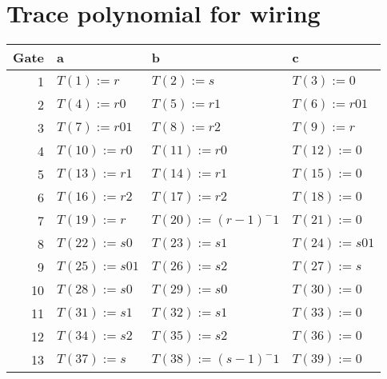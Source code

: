 \documentclass[11pt]{article}
\begin{document}
\section{Trace polynomial for wiring}
\label{sec:org232436d}
\begin{center}
\begin{tabular}{rlll}
Gate & a & b & c\\[0pt]
\hline
1 & \(T(1) := r\) & \(T(2):=s\) & \(T(3) :=  0\)\\[0pt]
2 & \(T(4) := r0\) & \(T(5):=r1\) & \(T(6) := r01\)\\[0pt]
3 & \(T(7) := r01\) & \(T(8) := r2\) & \(T(9) := r\)\\[0pt]
4 & \(T({10}) := r0\) & \(T({11}) := r0\) & \(T({12}) := 0\)\\[0pt]
5 & \(T({13}) := r1\) & \(T({14}) := r1\) & \(T({15}) := 0\)\\[0pt]
6 & \(T({16}) := r2\) & \(T({17}) := r2\) & \(T({18}) := 0\)\\[0pt]
7 & \(T({19}) := r\) & \(T({20}) := (r-1)^-1\) & \(T({21}) := 0\)\\[0pt]
8 & \(T({22}) := s0\) & \(T({23}) := s1\) & \(T({24}) := s01\)\\[0pt]
9 & \(T({25}) := s01\) & \(T({26}) := s2\) & \(T({27}) := s\)\\[0pt]
10 & \(T({28}) := s0\) & \(T({29}) := s0\) & \(T({30}) := 0\)\\[0pt]
11 & \(T({31}) := s1\) & \(T({32}) := s1\) & \(T({33}) := 0\)\\[0pt]
12 & \(T({34}) := s2\) & \(T({35}) := s2\) & \(T({36}) := 0\)\\[0pt]
13 & \(T({37}) := s\) & \(T({38}) := (s-1)^-1\) & \(T({39}) := 0\)\\[0pt]
\hline
\end{tabular}
\end{center}
\end{document}
